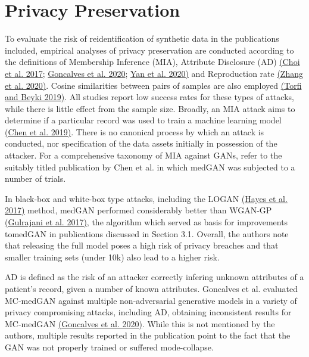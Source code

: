 \documentclass[10pt]{article}
\begin{document}
\section{Privacy Preservation}
To evaluate the risk of reidentification of synthetic data in the publications included, empirical analyses of privacy preservation are conducted according to the definitions of Membership Inference (MIA), Attribute Disclosure (AD)  \hyperref[csl:47]{(Choi et al. 2017}; \hyperref[csl:18]{Goncalves et al. 2020}; \hyperref[csl:46]{Yan et al. 2020)} and Reproduction rate \hyperref[csl:32]{(Zhang et al. 2020)}. Cosine similarities between pairs of samples are also employed \hyperref[csl:37]{(Torfi and Beyki 2019)}. All studies report low success rates for these types of attacks, while there is little effect from the sample size. Broadly, an MIA attack aims to determine if a particular record was used to train a machine learning model \hyperref[csl:27]{(Chen et al. 2019)}. There is no canonical process by which an attack is conducted, nor specification of the data assets initially in possession of the attacker. For a comprehensive taxonomy of MIA against GANs, refer to the suitably titled publication by Chen et al. in which medGAN was subjected to a number of trials.\par
In black-box and white-box type attacks, including the LOGAN \hyperref[csl:55]{(Hayes et al. 2017)} method, medGAN performed considerably better than WGAN-GP \hyperref[csl:43]{(Gulrajani et al. 2017)}, the algorithm which served as basis for improvements tomedGAN in publications discussed in Section 3.1. Overall, the authors note that releasing the full model poses a high risk of privacy breaches and that smaller training sets (under 10k) also lead to a higher risk.\par  
AD is defined as the risk of an attacker correctly infering unknown attributes of a patient's record, given a number of known attributes. Goncalves et al. evaluated MC-medGAN against multiple non-adversarial generative models in a variety of privacy compromising attacks, including AD, obtaining inconsistent results for MC-medGAN \hyperref[csl:18]{(Goncalves et al. 2020)}. While this is not mentioned by the authors, multiple results reported in the publication point to the fact that the GAN was not properly trained or suffered mode-collapse.\par
\end{document}
